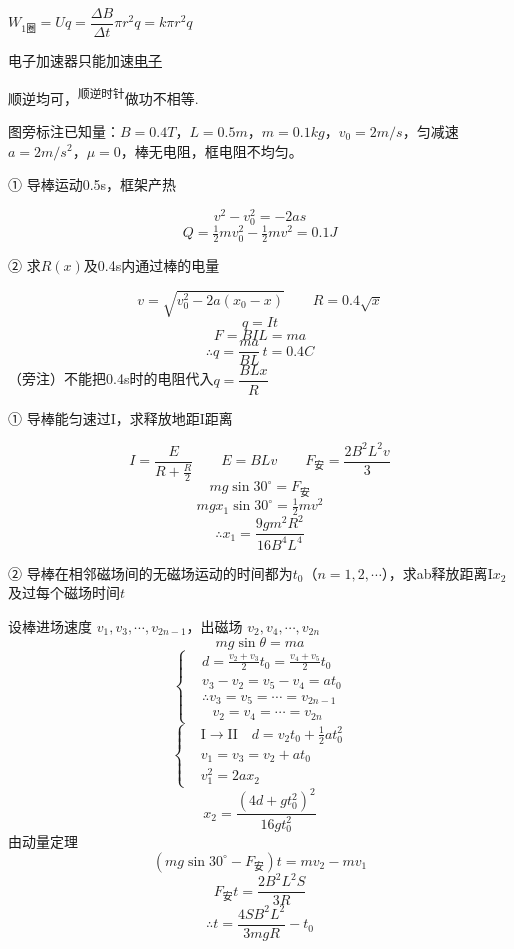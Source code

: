 \noindent $W_{1\text{圈}}=Uq=\dfrac{\Delta B}{\Delta t}\pi r^2q=k\pi r^2q$

\noindent 电子加速器只能加速\underline{电子}

\noindent 顺逆均可，\textsuperscript{顺逆时针}做功不相等.
\begin{problem}
图旁标注已知量：$B=0.4\unit{T}$，$L=0.5\unit{m}$，$m=0.1\unit{kg}$，$v_0=2\unit{m/s}$，匀减速 $a=2\unit{m/s^2}$，$\mu=0$，棒无电阻，框电阻不均匀。

① 导棒运动0.5s，框架产热 %
\begin{solution}
\[ v^2-v_0^2=-2as \]
\[ Q=\tfrac12mv_0^2-\tfrac12mv^2=0.1\unit{J} \]
\end{solution}
② 求$R(x)$及0.4s内通过棒的电量
\begin{solution}
\[ v=\sqrt{v_0^2-2a(x_0-x)}\qquad R=0.4\sqrt{x} \]
\[ q=It \]
\[ F=BIL=ma \]
\[ \therefore q=\frac{ma}{BL}\,t=0.4\unit{C} \]
（旁注）不能把0.4s时的电阻代入$q=\dfrac{BLx}{R}$
\end{solution}
\end{problem}
\begin{problem}
① 导棒能匀速过$\mathrm{I}$，求释放地距$\mathrm{I}$距离 %
\begin{solution}
\[ I=\frac{E}{R+\frac{R}{2}}\qquad E=BLv\qquad F_{\text{安}}=\frac{2B^2L^2v}{3} \] %
\[ mg\sin30^\circ=F_{\text{安}} \]
\[ mgx_1\sin30^\circ=\tfrac12mv^2 \]
\[ \therefore x_1=\frac{9gm^2R^2}{16B^4L^4} \]
\end{solution}
② 导棒在相邻磁场间的无磁场运动的时间都为$t_0$（$n=1,2,\cdots$），求ab释放距离$\mathrm{I}$$x_2$及过每个磁场时间$t$
\begin{solution}
设棒进场速度 $v_1,v_3,\cdots,v_{2n-1}$，出磁场 $v_2,v_4,\cdots,v_{2n}$
\[ mg\sin\theta=ma \]
\[
\left\{\begin{aligned}
&d=\frac{v_2+v_3}{2}t_0=\frac{v_4+v_5}{2}t_0\\
&v_3-v_2=v_5-v_4=at_0\\
&\therefore v_3=v_5=\cdots=v_{2n-1}\\
&\phantom{\therefore\ }v_2=v_4=\cdots=v_{2n}
\end{aligned}\right.
\]
\[
\left\{\begin{aligned}
&\mathrm{I}\to\mathrm{II}\quad d=v_2t_0+\tfrac12at_0^2\\
&v_1=v_3=v_2+at_0\\
&v_1^2=2ax_2
\end{aligned}\right.
\]
\[ x_2=\frac{(4d+gt_0^2)^2}{16gt_0^2} \]
由动量定理
\[ (mg\sin30^\circ-F_{\text{安}})t=mv_2-mv_1 \]
\[ F_{\text{安}}t=\frac{2B^2L^2S}{3R} \]
\[ \therefore t=\frac{4SB^2L^2}{3mgR}-t_0 \]
\end{solution}
\end{problem}
